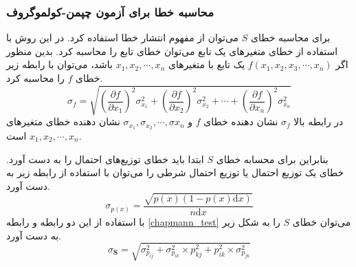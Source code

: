 \subsubsection{محاسبه خطا برای آزمون چپمن-کولموگروف}
برای محاسبه خطای $S$ می‌توان از مفهوم انتشار خطا استفاده کرد. در این روش با استفاده از خطای متغیرهای یک تابع می‌توان خطای تابع را 
محاسبه کرد. بدین منظور اگر $f(x_1,x_2,x_3, \cdots ,x_n)$ یک تابع با متغیرهای $x_1,x_2,
\cdots ,x_n$ باشد، می‌توان با رابطه زیر خطای $f$ را محاسبه کرد.
\begin{equation}
  \sigma_{f}=\sqrt{\left(\frac{\partial f}{\partial x_1}\right)^{2} \sigma_{x_1}^{2}+\left(\frac{\partial f}{\partial x_2}\right)^{2} \sigma_{x_2}^{2}+ \cdots + \left(\frac{\partial f}{\partial x_n}\right)^{2} \sigma_{x_n}^{2}}
  \label{error_propagation}
  \end{equation}
در رابطه بالا $\sigma_f$ نشان دهنده خطای $f$ و $\sigma_{x_1}, \sigma_{x_2}, \cdots , \sigma{x_n}$ نشان دهنده خطای متغیرهای $x_1, x_2, \cdots, x_n$ است.

بنابراین برای محسابه خطای $S$ ابتدا باید خطای توزیع‌های احتمال را به دست آورد. خطای یک توزیع احتمال یا توزیع احتمال شرطی را می‌توان با استفاده از رابطه زیر به دست آورد.\cite{prinz_markov_2011}
\begin{equation}
  \sigma_{p(x)}=\frac{\sqrt{p(x)(1-p(x) \mathrm{d} x)}}{ n \mathrm{d} x}
\end{equation}
با استفاده از این دو رابطه و رابطه \ref{chapmann_test} می‌توان خطای $S$ را به شکل زیر به دست آورد.
\begin{equation}
  \sigma_\mathbf{S} = \sqrt{\sigma_{p_{i j}}^2 + \sigma_{p_{i k}}^2 \times p_{k j}^2 + p_{i k}^2 \times \sigma_{p_{j k}}^2}
\end{equation}


